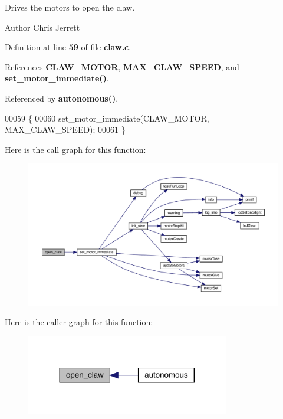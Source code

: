 Drives the motors to open the claw. 

\begin{DoxyAuthor}{Author}
Chris Jerrett 
\end{DoxyAuthor}


Definition at line \textbf{ 59} of file \textbf{ claw.\+c}.



References \textbf{ C\+L\+A\+W\+\_\+\+M\+O\+T\+OR}, \textbf{ M\+A\+X\+\_\+\+C\+L\+A\+W\+\_\+\+S\+P\+E\+ED}, and \textbf{ set\+\_\+motor\+\_\+immediate()}.



Referenced by \textbf{ autonomous()}.


\begin{DoxyCode}
00059                  \{
00060   set_motor_immediate(CLAW_MOTOR, MAX_CLAW_SPEED);
00061 \}
\end{DoxyCode}
Here is the call graph for this function\+:\nopagebreak
\begin{figure}[H]
\begin{center}
\leavevmode
\includegraphics[width=350pt]{claw_8h_a03023ca28f671b9fa7bac07782ccd8c1_cgraph}
\end{center}
\end{figure}
Here is the caller graph for this function\+:\nopagebreak
\begin{figure}[H]
\begin{center}
\leavevmode
\includegraphics[width=251pt]{claw_8h_a03023ca28f671b9fa7bac07782ccd8c1_icgraph}
\end{center}
\end{figure}
\mbox{\label{claw_8h_a3a57f998b1884d39b0cc786689f7086f}} 
